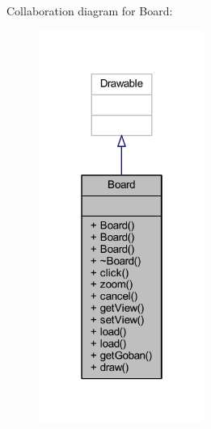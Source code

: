 Collaboration diagram for Board\+:\nopagebreak
\begin{figure}[H]
\begin{center}
\leavevmode
\includegraphics[width=154pt]{class_board__coll__graph}
\end{center}
\end{figure}
